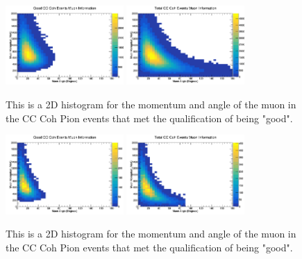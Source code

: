 \documentclass[11pt]{article}
\begin{document}
\begin{figure}[H]
\centering
\includegraphics[width=0.4\textwidth]{NewANMReinSehgalImages/6-GoodCCCohMuonInfoANMRS.png}
\includegraphics[width=0.4\textwidth]{NewANMReinSehgalImages/9-TotalCCCohMuonInfoANMRS.png}
\caption{This is a 2D histogram for the momentum and angle of the muon in the CC Coh Pion events that met the qualification of being "good".}
\end{figure}

\begin{figure}[H]
\centering
\includegraphics[width=0.4\textwidth]{NewANMReinSehgalImages/7.png}
\includegraphics[width=0.4\textwidth]{NewANMReinSehgalImages/8.png}
\caption{This is a 2D histogram for the momentum and angle of the muon in the CC Coh Pion events that met the qualification of being "good".}
\end{figure}


\end{document}
